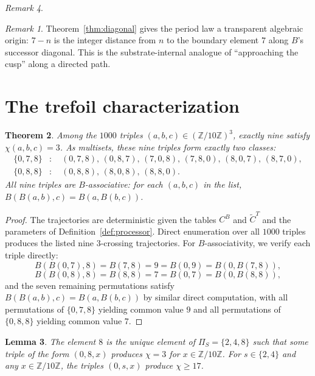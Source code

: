 \documentclass[submission,copyright,creativecommons]{eptcs}
\theoremstyle{plain}
\newtheorem{theorem}{Theorem}
\newtheorem{lemma}[theorem]{Lemma}
\theoremstyle{definition}
\theoremstyle{remark}
\newtheorem{remark}[theorem]{Remark}
\begin{document}
\begin{remark}
\begin{remark}
Theorem~\ref{thm:diagonal} gives the period law a transparent algebraic
origin: $7 - n$ is the integer distance from $n$ to the boundary element
$7$ along $B$'s successor diagonal. This is the substrate-internal
analogue of ``approaching the cusp'' along a directed path.
\end{remark}

\section{The trefoil characterization}\label{sec:trefoil}

\begin{theorem}\label{thm:trefoil}
Among the $1000$ triples $(a, b, c) \in (\mathbb{Z}/10\mathbb{Z})^3$,
exactly nine satisfy $\chi(a, b, c) = 3$. As multisets, these nine triples
form exactly two classes:
\begin{align*}
\{0, 7, 8\} &: \quad (0, 7, 8),\, (0, 8, 7),\, (7, 0, 8),\, (7, 8, 0),\, (8, 0, 7),\, (8, 7, 0), \\
\{0, 8, 8\} &: \quad (0, 8, 8),\, (8, 0, 8),\, (8, 8, 0).
\end{align*}
All nine triples are $B$-associative: for each $(a, b, c)$ in the list,
$B(B(a, b), c) = B(a, B(b, c))$.
\end{theorem}

\begin{proof}
The trajectories are deterministic given the tables $C^B$ and $\widetilde{C}^T$
and the parameters of Definition~\ref{def:processor}. Direct enumeration over
all $1000$ triples produces the listed nine $3$-crossing trajectories. For
$B$-associativity, we verify each triple directly:
\[
B(B(0, 7), 8) = B(7, 8) = 9 = B(0, 9) = B(0, B(7, 8)),
\]
\[
B(B(0, 8), 8) = B(8, 8) = 7 = B(0, 7) = B(0, B(8, 8)),
\]
and the seven remaining permutations satisfy $B(B(a, b), c) = B(a, B(b, c))$
by similar direct computation, with all permutations of $\{0, 7, 8\}$
yielding common value $9$ and all permutations of $\{0, 8, 8\}$ yielding
common value $7$.
\end{proof}

\begin{lemma}\label{lem:eight-uniqueness}
The element $8$ is the unique element of $\Pi_S = \{2, 4, 8\}$ such that
some triple of the form $(0, 8, x)$ produces $\chi = 3$ for $x \in
\mathbb{Z}/10\mathbb{Z}$. For $s \in \{2, 4\}$ and any $x \in
\mathbb{Z}/10\mathbb{Z}$, the triples $(0, s, x)$ produce $\chi \geq 17$.
\end{lemma}


\end{remark}
\end{document}
